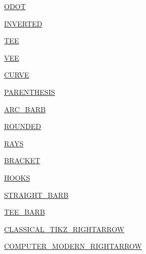 \begin{DoxyCompactItemize}
\item 
\hyperlink{enumcom_1_1aarrelaakso_1_1drawl_1_1_arrowhead_1_1_type_a70d3e12a9991fd0a941d9c25138476a7}{O\+D\+OT}
\item 
\hyperlink{enumcom_1_1aarrelaakso_1_1drawl_1_1_arrowhead_1_1_type_a47f58944f623a14d0f2b7ea990ba33c9}{I\+N\+V\+E\+R\+T\+ED}
\item 
\hyperlink{enumcom_1_1aarrelaakso_1_1drawl_1_1_arrowhead_1_1_type_a5820127f9ecd65921ffcfb02e2d2eb08}{T\+EE}
\item 
\hyperlink{enumcom_1_1aarrelaakso_1_1drawl_1_1_arrowhead_1_1_type_a8301a8818926413534a5604df1e91dac}{V\+EE}
\item 
\hyperlink{enumcom_1_1aarrelaakso_1_1drawl_1_1_arrowhead_1_1_type_acf2cc415237f597e19ef2cbca0059cbb}{C\+U\+R\+VE}
\item 
\hyperlink{enumcom_1_1aarrelaakso_1_1drawl_1_1_arrowhead_1_1_type_a9de2bdf02534510c099f856ded0500e3}{P\+A\+R\+E\+N\+T\+H\+E\+S\+IS}
\item 
\hyperlink{enumcom_1_1aarrelaakso_1_1drawl_1_1_arrowhead_1_1_type_ab1a7fc7ccf7d089ac3b9b542d5658a7d}{A\+R\+C\+\_\+\+B\+A\+RB}
\item 
\hyperlink{enumcom_1_1aarrelaakso_1_1drawl_1_1_arrowhead_1_1_type_a44ab18e4cfb9887938af1017cb7db82f}{R\+O\+U\+N\+D\+ED}
\item 
\hyperlink{enumcom_1_1aarrelaakso_1_1drawl_1_1_arrowhead_1_1_type_a586dd8decad3018c6d7c69b98aa2fee5}{R\+A\+YS}
\item 
\hyperlink{enumcom_1_1aarrelaakso_1_1drawl_1_1_arrowhead_1_1_type_a1752cfa6d6458e674f51b591c1f13982}{B\+R\+A\+C\+K\+ET}
\item 
\hyperlink{enumcom_1_1aarrelaakso_1_1drawl_1_1_arrowhead_1_1_type_ac7785804ee71d88f541c4aab8b1c7855}{H\+O\+O\+KS}
\item 
\hyperlink{enumcom_1_1aarrelaakso_1_1drawl_1_1_arrowhead_1_1_type_a7500173be6145013e3c1d5aa7068b431}{S\+T\+R\+A\+I\+G\+H\+T\+\_\+\+B\+A\+RB}
\item 
\hyperlink{enumcom_1_1aarrelaakso_1_1drawl_1_1_arrowhead_1_1_type_a80a60c14eb16a71b758fd9cfc81e2952}{T\+E\+E\+\_\+\+B\+A\+RB}
\item 
\hyperlink{enumcom_1_1aarrelaakso_1_1drawl_1_1_arrowhead_1_1_type_a7d11f7c30dc23c5697f520b5e1230efe}{C\+L\+A\+S\+S\+I\+C\+A\+L\+\_\+\+T\+I\+K\+Z\+\_\+\+R\+I\+G\+H\+T\+A\+R\+R\+OW}
\item 
\hyperlink{enumcom_1_1aarrelaakso_1_1drawl_1_1_arrowhead_1_1_type_a23ba1f0a86e5037ac9327f2743a4bede}{C\+O\+M\+P\+U\+T\+E\+R\+\_\+\+M\+O\+D\+E\+R\+N\+\_\+\+R\+I\+G\+H\+T\+A\+R\+R\+OW}

\end{DoxyCompactItemize}
